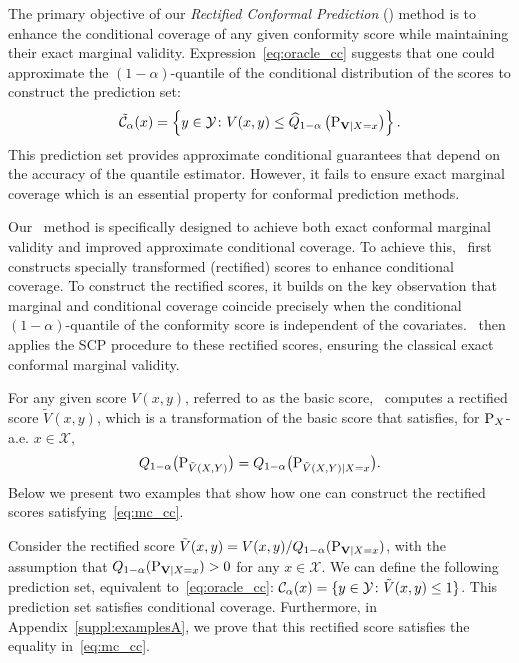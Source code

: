 
\vspace{-10pt}
  The primary objective of our \textit{Rectified Conformal Prediction} (\RCP) method is to enhance the conditional coverage of any given conformity score while maintaining their exact marginal validity. Expression~\eqref{eq:oracle_cc} suggests that one could approximate the $(1-\alpha)$-quantile of the conditional distribution of the scores to construct the prediction set:
  \begin{equation*}
    \tilde{\mathcal{C}}_{\alpha}(x)
    =
    \left\{{
      y \in \mathcal{Y}\colon V(x, y)\le \widehat{Q}_{1-\alpha}\left({\textup{P}_{\mathbf{V}\mid X = x}}\right)
    }\right\}.
  \end{equation*}
  This prediction set provides approximate conditional guarantees that depend on the accuracy of the quantile estimator. However, it fails to ensure exact marginal coverage which is an essential property for conformal prediction methods. 


  Our \RCP\ method is specifically designed to achieve both exact conformal marginal validity and improved approximate conditional coverage. To achieve this, \RCP\ first constructs specially transformed (rectified) scores to enhance conditional coverage. To construct the rectified scores, it builds on the key observation that marginal and conditional coverage coincide precisely when the conditional $(1-\alpha)$-quantile of the conformity score is independent of the covariates. \RCP\ then applies the SCP procedure to these rectified scores, ensuring the classical exact conformal marginal validity. 

  For any given score $V(x, y)$, referred to as the basic score, \RCP\ computes a rectified score $\tilde{V}(x, y)$, which is a transformation of the basic score that satisfies, for $\textup{P}_X$-a.e. $x \in \mathcal{X}$,
  \begin{equation}
    Q_{1-\alpha}\bigl(\textup{P}_{\tilde{V}(X, Y)}\bigr) = Q_{1-\alpha}\bigl(\textup{P}_{\tilde{V}(X, Y)|X=x}\bigr).
  \label{eq:mc_cc}
  \end{equation}
  Below we present two examples that show how one can construct the rectified scores satisfying~\eqref{eq:mc_cc}.

  \begin{example}
  \label{example:linear}
    Consider the rectified score $\tilde{V}(x, y) = V(x, y) / Q_{1-\alpha}(\textup{P}_{\mathbf{V}|X=x})$, with the assumption that $Q_{1-\alpha}(\textup{P}_{\mathbf{V}|X=x})> 0$ for any $x \in \mathcal{X}$. We can define the following prediction set, equivalent to~\eqref{eq:oracle_cc}:
    $\mathcal{C}_{\alpha}(x) = \{y \in \mathcal{Y}\colon \tilde V(x, y) \leq 1 \}$. 
    This prediction set satisfies conditional coverage. %
    Furthermore, in Appendix~\ref{suppl:examplesA}, we prove that this rectified score satisfies the equality in~\eqref{eq:mc_cc}.
  \end{example}

